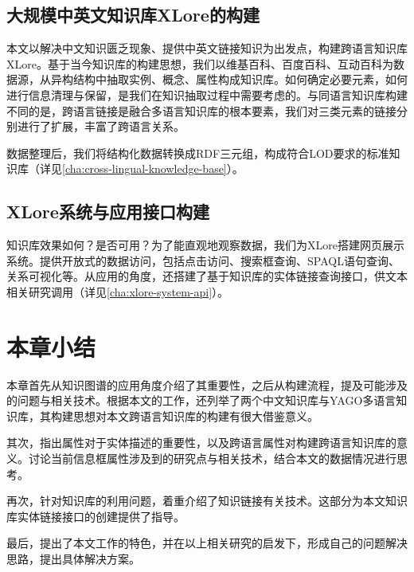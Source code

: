 \subsection{大规模中英文知识库XLore的构建}
本文以解决中文知识匮乏现象、提供中英文链接知识为出发点，构建跨语言知识库XLore。基于当今知识库的构建思想，我们以维基百科、百度百科、互动百科为数据源，从异构结构中抽取实例、概念、属性构成知识库。如何确定必要元素，如何进行信息清理与保留，是我们在知识抽取过程中需要考虑的。与同语言知识库构建不同的是，跨语言链接是融合多语言知识库的根本要素，我们对三类元素的链接分别进行了扩展，丰富了跨语言关系。

数据整理后，我们将结构化数据转换成RDF三元组，构成符合LOD要求的标准知识库（详见\ref{cha:cross-lingual-knowledge-base}）。

\subsection{XLore系统与应用接口构建}

知识库效果如何？是否可用？为了能直观地观察数据，我们为XLore搭建网页展示系统。提供开放式的数据访问，包括点击访问、搜索框查询、SPAQL语句查询、关系可视化等。从应用的角度，还搭建了基于知识库的实体链接查询接口，供文本相关研究调用（详见\ref{cha:xlore-system-api}）。

\section{本章小结}
本章首先从知识图谱的应用角度介绍了其重要性，之后从构建流程，提及可能涉及的问题与相关技术。根据本文的工作，还列举了两个中文知识库与YAGO多语言知识库，其构建思想对本文跨语言知识库的构建有很大借鉴意义。

其次，指出属性对于实体描述的重要性，以及跨语言属性对构建跨语言知识库的意义。讨论当前信息框属性涉及到的研究点与相关技术，结合本文的数据情况进行思考。

再次，针对知识库的利用问题，着重介绍了知识链接有关技术。这部分为本文知识库实体链接接口的创建提供了指导。

最后，提出了本文工作的特色，并在以上相关研究的启发下，形成自己的问题解决思路，提出具体解决方案。


